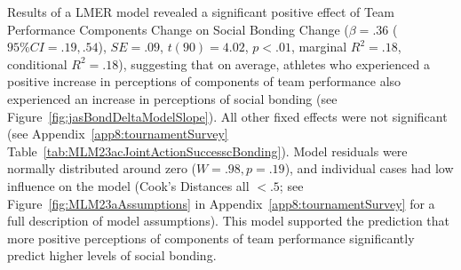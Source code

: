 \begin{CJK}{UTF8}{gbsn}
Results of a LMER model revealed a significant positive effect of  Team Performance Components Change on Social Bonding Change ($\beta = .36$ ($95\% CI =  .19, .54$), $SE = .09$, $t(90) = 4.02$, $p < .01$, marginal $R^2 = .18$, conditional $R^2 = .18$), suggesting that on average, athletes who experienced a positive increase in perceptions of components of team performance also experienced an increase in perceptions of social bonding (see Figure~\ref{fig:jasBondDeltaModelSlope}). All other fixed effects were not significant (see Appendix~\ref{app8:tournamentSurvey} Table~\ref{tab:MLM23acJointActionSuccesscBonding}). Model residuals were normally distributed around zero ($W = .98, p = .19$), and individual cases had low influence on the model (Cook's Distances all $< .5$; see Figure~\ref{fig:MLM23aAssumptions} in Appendix~\ref{app8:tournamentSurvey} for a full description of model assumptions).  This model supported the prediction that more positive perceptions of components of team performance significantly predict higher levels of social bonding.







\end{CJK}
